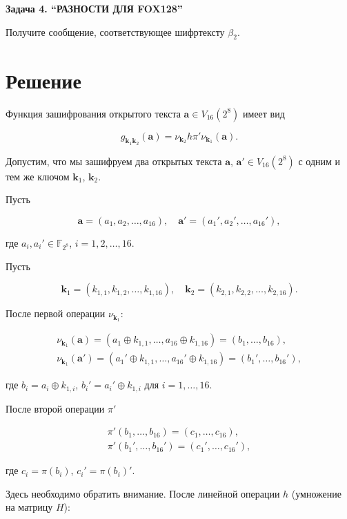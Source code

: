 \documentclass{article}
\begin{document}
\begin{center}
    \Huge\textbf{Задача 4. ``РАЗНОСТИ ДЛЯ FOX128''}
\end{center}

Получите сообщение, соответствующее шифртексту $\beta_2$.

\section{Решение}

Функция зашифрования открытого текста $\bm{a} \in V_{16}(2^8)$ имеет вид

$$g_{\bm{k}_1 \bm{k}_2}(\bm{a}) = \nu_{\bm{k}_2} h \pi' \nu_{\bm{k}_1}(\bm{a}).$$

Допустим, что мы зашифруем два открытых текста $\bm{a}$, $\bm{a}' \in V_{16}(2^8)$ с одним и тем же ключом $\bm{k}_1$, $\bm{k}_2$.

Пусть

$$\bm{a} = (a_1, a_2, \ldots, a_{16}), \quad \bm{a}' = (a_1', a_2', \ldots, a_{16}'),$$

где $a_i, a_i' \in \mathbb{F}_{2^8}$, $i = 1, 2, \ldots, 16$.

Пусть

$$\bm{k}_1 = (k_{1, 1}, k_{1, 2}, \ldots, k_{1, 16}), \quad \bm{k}_2 = (k_{2, 1}, k_{2, 2}, \ldots, k_{2, 16}).$$

После первой операции $\nu_{\bm{k}_1}$:

\[\begin{split}
    \nu_{\bm{k}_1}(\bm{a}) = (a_1 \oplus k_{1,1}, \ldots, a_{16} \oplus k_{1, 16}) = (b_1, \ldots, b_{16}), \\
    \nu_{\bm{k}_1}(\bm{a}') = (a_1' \oplus k_{1,1}, \ldots, a_{16}' \oplus k_{1, 16}) = (b_1', \ldots, b_{16}'),
\end{split}\]

где $b_i = a_i \oplus k_{1, i}$, $b_i' = a_i' \oplus k_{1, i}$ для $i = 1, \ldots, 16$.

После второй операции $\pi'$

\[\begin{split}
    \pi'(b_1, \ldots, b_{16}) = (c_1, \ldots, c_{16}), \\
    \pi'(b_1', \ldots, b_{16}') = (c_1', \ldots, c_{16}'),
\end{split}\]

где $c_i = \pi(b_i)$, $c_i' = \pi(b_i)'$.

Здесь необходимо обратить внимание. После линейной операции $h$ (умножение на матрицу $H$):
\end{document}
